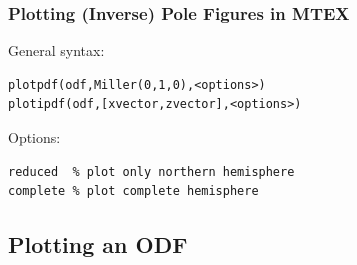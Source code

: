 \documentclass{beamer}
\newcommand{\MTEX}{{\bf {\color{red}M}TEX\,}}%
\begin{document}
\begin{frame}[fragile]
  \frametitle{Plotting (Inverse) Pole Figures in \MTEX}
  
  General syntax:
\begin{lstlisting}
plotpdf(odf,Miller(0,1,0),<options>)
plotipdf(odf,[xvector,zvector],<options>)
\end{lstlisting}

Options:
\begin{lstlisting}
reduced  % plot only northern hemisphere
complete % plot complete hemisphere
\end{lstlisting}



\end{frame}


\subsection*{Plotting an ODF}
\end{document}
